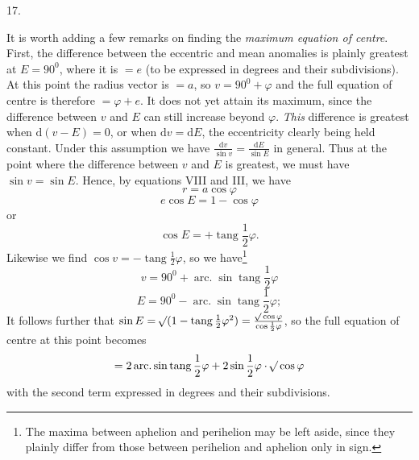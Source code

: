 \par{}
\begin{center}
\hypertarget{native-035-article017}{}17.
\end{center}
It is worth adding a few remarks on finding the \emph{maximum equation of centre}. First, the difference between the eccentric and mean anomalies is plainly greatest at $E=90^0$, where it is $=e$ (to be expressed in degrees and their subdivisions). At this point the radius vector is $=a$, so $v=90^0+\varphi$ and the full equation of centre is therefore $=\varphi+e$. It does not yet attain its maximum, since the difference between $v$ and $E$ can still increase beyond $\varphi$. \emph{This} difference is greatest when $\mathrm{d}(v-E)=0$, or when $\mathrm{d}v=\mathrm{d}E$, the eccentricity clearly being held constant. Under this assumption we have $\frac{\mathrm{d}v}{\sin v}=\frac{\mathrm{d}E}{\sin E}$ in general. Thus at the point where the difference between $v$ and $E$ is greatest, we must have $\sin v=\sin E$. Hence, by equations VIII and III, we have
\[
r=a\cos\varphi
\]
\[
e\cos E=1-\cos\varphi
\]
or
\[
\cos E=+\operatorname{tang}\frac{1}{2}\varphi.
\]
Likewise we find $\cos v=-\operatorname{tang}\frac{1}{2}\varphi$, so we have\footnote{The maxima between aphelion and perihelion may be left aside, since they plainly differ from those between perihelion and aphelion only in sign.}
\[
v=90^0+\operatorname{arc.}\sin\operatorname{tang}\frac{1}{2}\varphi
\]
\[
E=90^0-\operatorname{arc.}\sin\operatorname{tang}\frac{1}{2}\varphi;
\]
It follows further that $\sin E=\mathord{{}^{}\!\surd}(1-\operatorname{tang}\frac{1}{2}\varphi^2)=\frac{\mathord{{}^{}\!\surd}\cos\varphi}{\cos\frac{1}{2}\varphi}$, so the full equation of centre at this point becomes
\[
=2\operatorname{arc.}\sin\operatorname{tang}\frac{1}{2}\varphi+2\sin\frac{1}{2}\varphi\cdot\mathord{{}^{}\!\surd}\cos\varphi
\]
with the second term expressed in degrees and their subdivisions.

